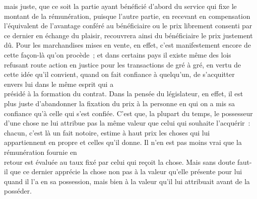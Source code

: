 \documentclass[french,twoside]{book} %
\begin{document}
mais juste, que ce soit la partie ayant bénéficié d’abord du service qui fixe le montant de la rémunération, puisque l’autre partie, en recevant en compensation l’équivalent de l’avantage conféré au bénéficiaire ou le prix librement consenti par ce dernier en échange du plaisir, recouvrera ainsi du bénéficiaire le prix justement dû. Pour les marchandises mises en vente, en effet, c’est manifestement encore de cette façon-là qu’on procède ; et dans certains pays il existe même des lois refusant route action en justice pour les transactions de gré à gré, en vertu de cette idée qu’il convient, quand on fait confiance à quelqu’un, de s’acquitter envers lui dans le même esprit qui a \\
présidé à la formation du contrat. Dans la pensée du législateur, en effet, il est plus juste d’abandonner la fixation du prix à la personne en qui on a mis sa confiance qu’à celle qui s’est confiée. C’est que, la plupart du temps, le possesseur d’une chose ne lui attribue pas la même valeur que celui qui souhaite l’acquérir : chacun, c’est là un fait notoire, estime à haut prix les choses qui lui appartiennent en propre et celles qu’il donne. Il n’en est pas moins vrai que la rémunération fournie en \\
retour est évaluée au taux fixé par celui qui reçoit la chose. Mais sans doute faut-il que ce dernier apprécie la chose non pas à la valeur qu’elle présente pour lui quand il l’a en sa possession, mais bien à la valeur qu’il lui attribuait avant de la posséder.
\end{document}
